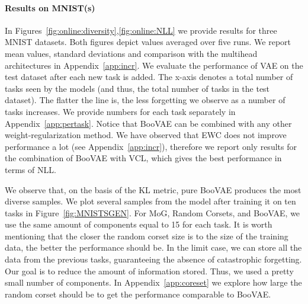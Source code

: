 \paragraph{Results on MNIST(s)}
In Figures~\ref{fig:online:diversity},\ref{fig:online:NLL} we provide results for three MNIST datasets. 
Both figures depict values averaged over five runs. We report mean values, standard deviations and comparison with the multihead architectures in Appendix~\ref{app:incr}. We evaluate the performance of VAE on the test dataset after each new task is added. The x-axis denotes a total number of tasks seen by the models (and thus, the total number of tasks in the test dataset). The flatter the line is, the less forgetting we observe as a number of tasks increases.  We provide numbers for each task separately in Appendix~\ref{app:pertask}. Notice that BooVAE can be combined with any other weight-regularization method. We have observed that EWC does not improve performance a lot (see Appendix~\ref{app:incr}), therefore we report only results for the combination of BooVAE with VCL, which gives the best performance in terms of NLL.

We observe that, on the basis of the KL metric, pure BooVAE produces the most diverse samples. We plot several samples from the model after training it on ten tasks in Figure~\ref{fig:MNISTSGEN}. For MoG, Random Corsets, and BooVAE, we use the same amount of components equal to 15 for each task. It is worth mentioning that the closer the random corset size is to the size of the training data, the better the performance should be. In the limit case, we can store all the data from the previous tasks, guaranteeing the absence of catastrophic forgetting. Our goal is to reduce the amount of information stored. Thus, we used a pretty small number of components. In Appendix~\ref{app:coreset} we explore how large the random corset should be to get the performance comparable to BooVAE. 



